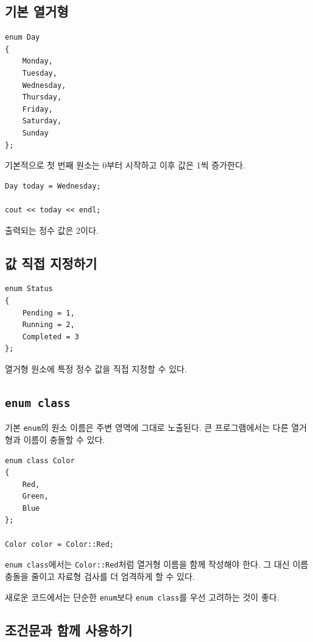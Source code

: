 \documentclass[11pt,a4paper]{article}
\begin{document}
\subsection{기본 열거형}

\begin{lstlisting}
enum Day
{
    Monday,
    Tuesday,
    Wednesday,
    Thursday,
    Friday,
    Saturday,
    Sunday
};
\end{lstlisting}

기본적으로 첫 번째 원소는 0부터 시작하고 이후 값은 1씩 증가한다.

\begin{lstlisting}
Day today = Wednesday;

cout << today << endl;
\end{lstlisting}

출력되는 정수 값은 2이다.

\subsection{값 직접 지정하기}

\begin{lstlisting}
enum Status
{
    Pending = 1,
    Running = 2,
    Completed = 3
};
\end{lstlisting}

열거형 원소에 특정 정수 값을 직접 지정할 수 있다.

\subsection{\texttt{enum class}}

기본 \texttt{enum}의 원소 이름은 주변 영역에 그대로 노출된다.
큰 프로그램에서는 다른 열거형과 이름이 충돌할 수 있다.

\begin{lstlisting}
enum class Color
{
    Red,
    Green,
    Blue
};

Color color = Color::Red;
\end{lstlisting}

\texttt{enum class}에서는 \texttt{Color::Red}처럼 열거형 이름을 함께 작성해야 한다.
그 대신 이름 충돌을 줄이고 자료형 검사를 더 엄격하게 할 수 있다.

\begin{importantbox}
새로운 코드에서는 단순한 \texttt{enum}보다 \texttt{enum class}를 우선 고려하는 것이 좋다.
\end{importantbox}

\subsection{조건문과 함께 사용하기}
\end{document}
